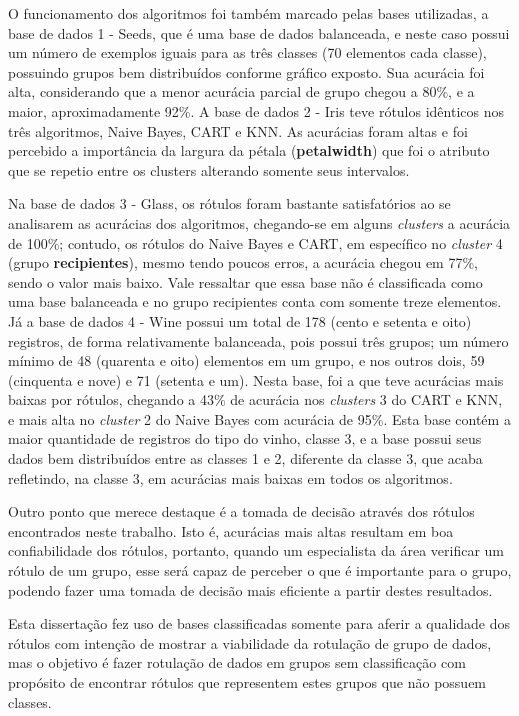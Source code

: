 O funcionamento dos algoritmos foi também marcado pelas bases utilizadas, a base de dados 1 - Seeds, que é uma base de dados balanceada, e neste caso possui um número de exemplos iguais para as três classes (70 elementos cada classe), possuindo grupos bem distribuídos conforme gráfico exposto. Sua acurácia foi alta, considerando que a menor acurácia parcial de grupo chegou a 80\%, e a maior, aproximadamente 92\%. A base de dados 2 - Iris teve rótulos idênticos nos três algoritmos, Naive Bayes, CART e KNN. As acurácias foram altas e foi percebido a importância da largura da pétala (\textbf{petalwidth}) que foi o atributo que se repetio entre os clusters alterando somente seus intervalos.

Na base de dados 3 - Glass, os rótulos foram bastante satisfatórios ao se analisarem as acurácias dos algoritmos, chegando-se em alguns \textit{clusters} a acurácia de 100\%; contudo, os rótulos do Naive Bayes e CART, em específico no \textit{cluster} 4 (grupo \textbf{recipientes}), mesmo tendo poucos erros, a acurácia chegou em 77\%, sendo o valor mais baixo. Vale ressaltar que essa base não é classificada como uma base balanceada e no grupo recipientes conta com somente treze elementos. Já a base de dados 4 - Wine possui um total de 178 (cento e setenta e oito) registros, de  forma relativamente balanceada, pois possui três grupos; um número mínimo de 48 (quarenta e oito) elementos em um grupo, e nos outros dois, 59 (cinquenta e nove) e 71 (setenta e um). Nesta base, foi a que teve acurácias mais baixas por rótulos, chegando a 43\% de acurácia nos \textit{clusters} 3 do CART e KNN, e mais alta no \textit{cluster} 2 do Naive Bayes com acurácia de 95\%.
Esta base contém a maior quantidade de registros do tipo do vinho, classe 3, e a base possui seus dados bem distribuídos entre as classes 1 e 2, diferente da classe 3, que acaba refletindo, na classe 3, em acurácias mais baixas em todos os algoritmos.

Outro ponto que merece destaque é a tomada de decisão através dos rótulos encontrados neste trabalho. Isto é, acurácias mais altas resultam em boa confiabilidade dos rótulos, portanto, quando um especialista da área verificar um rótulo de um grupo, esse será capaz de perceber o que é importante para o grupo, podendo fazer uma tomada de decisão mais eficiente a partir destes resultados. 

Esta dissertação fez uso de bases classificadas somente para aferir a qualidade dos rótulos com intenção de mostrar a viabilidade da rotulação de grupo de dados, mas o objetivo é fazer rotulação de dados em grupos sem classificação com propósito de encontrar rótulos que representem estes grupos que não possuem classes.


